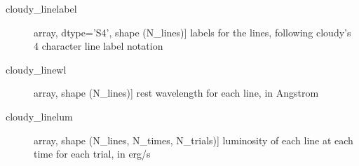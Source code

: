 \documentclass[letterpaper,10pt,english]{sphinxmanual}
\begin{document}
\begin{fulllineitems}
\begin{description}
\begin{description}
\item[{cloudy\_linelabel}] \leavevmode{[}array, dtype=’S4’, shape (N\_lines){]}
labels for the lines, following cloudy’s 4 character line label
notation

\item[{cloudy\_linewl}] \leavevmode{[}array, shape (N\_lines){]}
rest wavelength for each line, in Angstrom

\item[{cloudy\_linelum}] \leavevmode{[}array, shape (N\_lines, N\_times, N\_trials){]}
luminosity of each line at each time for each trial, in erg/s

\end{description}

\end{description}

\end{fulllineitems}

\end{document}
